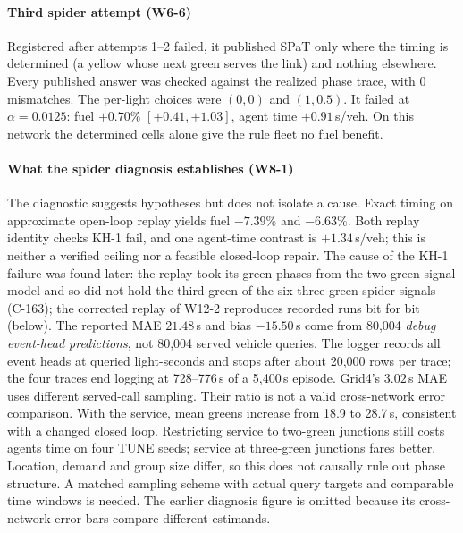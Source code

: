 \paragraph{Third spider attempt (W6-6)} Registered after attempts 1--2 failed, it published SPaT only where the timing is
determined (a yellow whose next green serves the link) and nothing elsewhere. Every published answer was checked against the realized
phase trace, with 0 mismatches. The per-light choices were $(0,0)$ and $(1,0.5)$. It failed at $\alpha=0.0125$: fuel $+0.70\%$
$[+0.41,+1.03]$, agent time $+0.91$\,s/veh. On this network the determined cells alone give the rule fleet no fuel benefit.

\paragraph{What the spider diagnosis establishes (W8-1)}
The diagnostic suggests hypotheses but does not isolate a cause. Exact timing on approximate open-loop replay yields fuel $-7.39\%$ and $-6.63\%$. Both replay identity checks KH-1 fail, and one agent-time contrast is $+1.34$\,s/veh; this is neither a verified ceiling nor a feasible closed-loop repair. The cause of the KH-1 failure was found later: the replay took its green phases from the two-green signal model and so did not hold the third green of the six three-green spider signals (C-163); the corrected replay of W12-2 reproduces recorded runs bit for bit (below).
The reported MAE $21.48$\,s and bias $-15.50$\,s come from 80,004 \emph{debug event-head predictions}, not 80,004 served vehicle queries. The logger records all event heads at queried light-seconds and stops after about 20,000 rows per trace; the four traces end logging at 728--776\,s of a 5,400\,s episode. Grid4's $3.02$\,s MAE uses different served-call sampling. Their ratio is not a valid cross-network error comparison.
With the service, mean greens increase from 18.9 to 28.7\,s, consistent with a changed closed loop. Restricting service to two-green junctions still costs agents time on four TUNE seeds; service at three-green junctions fares better. Location, demand and group size differ, so this does not causally rule out phase structure. A matched sampling scheme with actual query targets and comparable time windows is needed. The earlier diagnosis figure is omitted because its cross-network error bars compare different estimands.

